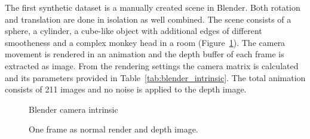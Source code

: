 The first synthetic dataset is a manually created scene in Blender\cite{blender}.
Both rotation and translation are done in isolation as well combined.
The scene consists of a sphere, a cylinder, a cube-like object with additional edges of different smootheness and a complex monkey head in a room (Figure~\ref{fig:blender_scene}).
The camera movement is rendered in an animation and the depth buffer of each frame is extracted as image.
From the rendering settings the camera matrix is calculated and its parameters provided in Table~\ref{tab:blender_intrinsic}.
The total animation consists of 211 images and no noise is applied to the depth image.
\begin{figure}[H]
\CenterFloatBoxes%
\begin{floatrow}
    {\caption{Blender camera intrinsic}\label{tab:blender_intrinsic}}%
    {\caption{One frame as normal render and depth image.}\label{fig:blender_scene}}
\end{floatrow}
\end{figure}

